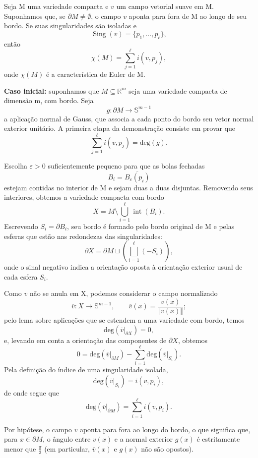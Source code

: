 \documentclass[../differential_topology.tex]{subfiles}
\begin{document}
\begin{theorem*}
	Seja M uma variedade compacta e \(v\) um campo vetorial suave em M. Suponhamos que, se \(\partial M\neq\emptyset\), o campo \(v\) aponta para fora de M ao longo de seu bordo. Se suas singularidades são isoladas e
	\[
		\operatorname{Sing}(v)=\{p_1,\dotsc,p_{\ell}\},
	\]
	então
	\[
		\boxed{\chi(M)=\sum_{j=1}^{\ell}i(v,p_j),}
	\]
	onde \(\chi(M)\) é a característica de Euler de M.
\end{theorem*}
\begin{proof*}
	\textbf{Caso inicial:} suponhamos que \(M\subseteq\mathbb{R}^{m}\) seja uma variedade compacta de dimensão m, com bordo. Seja
	\[
		g:\partial M\rightarrow\mathbb{S}^{m-1}
	\]
	a aplicação normal de Gauss, que associa a cada ponto do bordo seu vetor normal exterior unitário. A primeira etapa da demonstração consiste em provar que
	\[
		\boxed{\sum_{j=1}^{\ell}i(v,p_j)=\mathrm{deg}(g).}
	\]

	Escolha \(\varepsilon>0\) suficientemente pequeno para que as bolas fechadas
	\[
		B_i=\overline{B_{\varepsilon}(p_i)}
	\]
	estejam contidas no interior de M e sejam duas a duas disjuntas. Removendo seus interiores, obtemos a variedade compacta com bordo
	\[
		X=M\setminus\bigcup_{i=1}^{\ell}\operatorname{int}(B_i).
	\]
	Escrevendo \(S_i=\partial B_i\), seu bordo é formado pelo bordo original de M e pelas esferas que estão nas redondezas das singularidades:
	\[
		\partial X=\partial M\sqcup\left(\bigsqcup_{i=1}^{\ell}(-S_i)\right),
	\]
	onde o sinal negativo indica a orientação oposta à orientação exterior usual de cada esfera \(S_i\).

	Como \(v\) não se anula em X, podemos considerar o campo normalizado
	\[
		\overline v:X\rightarrow\mathbb{S}^{m-1},\qquad
		\overline v(x)=\frac{v(x)}{\Vert v(x)\Vert};
	\]
	pelo lema sobre aplicações que se estendem a uma variedade com bordo, temos
	\[
		\mathrm{deg}(\overline v|_{\partial X})=0,
	\]
	e, levando em conta a orientação das componentes de \(\partial X\), obtemos
	\[
		0=\mathrm{deg}(\overline v|_{\partial M})
		-\sum_{i=1}^{\ell}\mathrm{deg}(\overline v|_{S_i}).
	\]
	Pela definição do índice de uma singularidade isolada,
	\[
		\mathrm{deg}(\overline v|_{S_i})=i(v,p_i),
	\]
	de onde segue que
	\[
		\boxed{\mathrm{deg}(\overline v|_{\partial M})
			=\sum_{i=1}^{\ell}i(v,p_i).}
	\]

	Por hipótese, o campo \(v\) aponta para fora ao longo do bordo, o que significa que, para \(x\in\partial M\), o ângulo entre \(v(x)\) e a normal exterior \(g(x)\) é estritamente menor que \(\frac{\pi}{2}\) (em particular, \(\overline v(x)\) e \(g(x)\) não são opostos).


\end{proof*}
\end{document}

